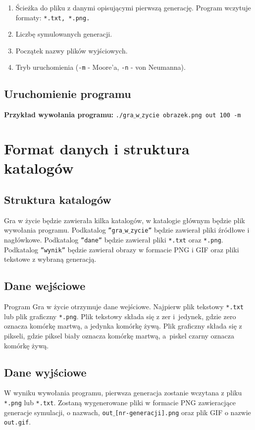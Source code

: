 \documentclass[a4paper, 12pt]{article}
\begin{document}
 		 	\begin{enumerate}
 			\item Ścieżka do pliku z danymi opisującymi pierwszą generację. Program wczytuje formaty: \texttt{*.txt, *.png.}
 			\item Liczbę symulowanych generacji.
 			\item Początek nazwy plików wyjściowych.
 			\item Tryb uruchomienia (\texttt{-m} - Moore'a, \texttt{-n} - von Neumanna).
 			\end{enumerate}
 			
 		\subsection{Uruchomienie programu}
			\hspace*{1cm}\textbf{Przykład wywołania programu:}
			\newline \texttt{./gra$\_$w$\_$zycie obrazek.png out 100 -m}
\newpage
	\section{Format danych i struktura katalogów} 
		\subsection{Struktura katalogów}
			\hspace*{1cm} Gra w życie będzie zawierała kilka katalogów, w katalogie głównym będzie plik wywołania programu. Podkatalog \texttt{''gra$\_$w$\_$zycie''} będzie zawierał pliki źródłowe i nagłówkowe. Podkatalog \texttt{''dane''} będzie zawierał pliki \texttt{*.txt} oraz \texttt{*.png}. Podkatalog \texttt{''wynik''} będzie zawierał obrazy w formacie PNG i GIF oraz pliki tekstowe z wybraną generacją.
		
		\subsection{Dane wejściowe}
			\hspace*{1cm} Program Gra w życie otrzymuje dane wejściowe. Najpierw plik tekstowy \texttt{*.txt} lub plik graficzny \texttt{*.png}. Plik tekstowy składa się z zer i~jedynek, gdzie zero oznacza komórkę martwą, a jedynka komórkę żywą. Plik graficzny składa się z pikseli, gdzie piksel biały oznacza komórkę martwą, a~piskel czarny oznacza komórkę żywą.
		
		\subsection{Dane wyjściowe}
			\hspace*{1cm} W wyniku wywołania programu, pierwsza generacja zostanie wczytana z pliku \texttt{*.png} lub \texttt{*.txt}. Zostaną wygenerowane pliki w formacie PNG zawieracjące generacje symulacji, o nazwach, \texttt{out$\_$[nr-generacji].png} oraz plik GIF o nazwie \texttt{out.gif}.
\newpage
\end{document}
